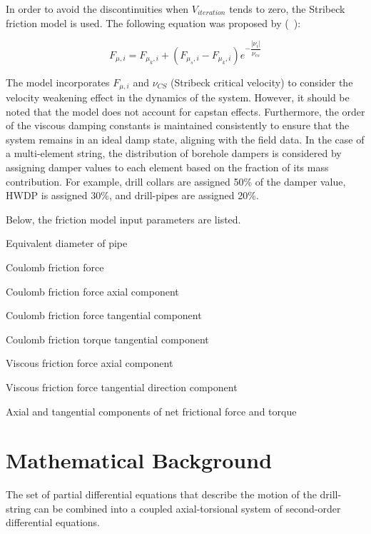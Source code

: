 In order to avoid the discontinuities when $V_{iteration}$ tends to zero, the Stribeck friction model is used. The following equation was proposed by (~\cite{ref:tustin1947a}):

\begin{equation}\label{Stribeck velocity}
  F_{\mu,i} = F_{\mu_{k},i} + (F_{\mu_{s},i} - F_{\mu_{k},i})e^{-\dfrac{|\nu_{i}|}{\nu_{cs}}}
\end{equation}

The model incorporates $F_{\mu,i}$ and $\nu_{CS}$ (Stribeck critical velocity) to consider the velocity weakening effect in the dynamics of the system. However, it should be noted that the model does not account for capstan effects. Furthermore, the order of the viscous damping constants is maintained consistently to ensure that the system remains in an ideal damp state, aligning with the field data. In the case of a multi-element string, the distribution of borehole dampers is considered by assigning damper values to each element based on the fraction of its mass contribution. For example, drill collars are assigned 50\% of the damper value, HWDP is assigned 30\%, and drill-pipes are assigned 20\%.

Below, the friction model input parameters are listed.
\begin{bulletedlist}
    \item Equivalent diameter of pipe
    \item Coulomb friction force
    \item Coulomb friction force axial component
    \item Coulomb friction force tangential component
    \item Coulomb friction torque tangential component
    \item Viscous friction force axial component
    \item Viscous friction force tangential direction component
    \item Axial and tangential components of net frictional force and torque
\end{bulletedlist}

\section{Mathematical Background}

The set of partial differential equations that describe the motion of the drill-string can be combined into a coupled axial-torsional system of second-order differential equations. 

